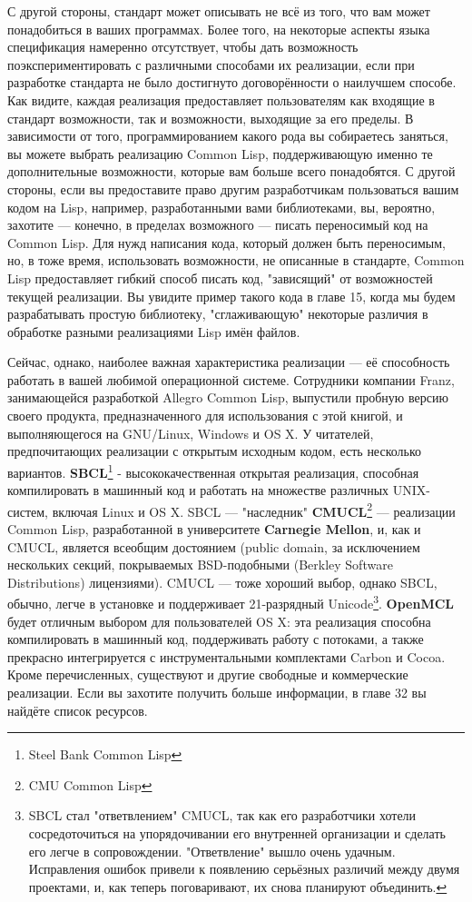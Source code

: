 С другой стороны, стандарт может описывать не всё из того, что вам может понадобиться в
ваших программах. Более того, на некоторые аспекты языка спецификация намеренно
отсутствует, чтобы дать возможность поэкспериментировать с различными способами их
реализации, если при разработке стандарта не было достигнуто договорённости о наилучшем
способе. Как видите, каждая реализация предоставляет пользователям как входящие в стандарт
возможности, так и возможности, выходящие за его пределы. В зависимости от того,
программированием какого рода вы собираетесь заняться, вы можете выбрать реализацию Common
Lisp, поддерживающую именно те дополнительные возможности, которые вам больше всего
понадобятся. С другой стороны, если вы предоставите право другим разработчикам
пользоваться вашим кодом на Lisp, например, разработанными вами библиотеками, вы,
вероятно, захотите --- конечно, в пределах возможного --- писать переносимый код на Common
Lisp. Для нужд написания кода, который должен быть переносимым, но, в тоже время,
использовать возможности, не описанные в стандарте, Common Lisp предоставляет гибкий
способ писать код, "зависящий" от возможностей текущей реализации. Вы увидите пример
такого кода в главе 15, когда мы будем разрабатывать простую библиотеку, "сглаживающую"
некоторые различия в обработке разными реализациями Lisp имён файлов.

Сейчас, однако, наиболее важная характеристика реализации --- её способность работать в
вашей любимой операционной системе. Сотрудники компании Franz, занимающейся разработкой
Allegro Common Lisp, выпустили пробную версию своего продукта, предназначенного для
использования с этой книгой, и выполняющегося на GNU/Linux, Windows и OS X. У читателей,
предпочитающих реализации с открытым исходным кодом, есть несколько
вариантов. \textbf{SBCL}\footnote{Steel Bank Common Lisp} - высококачественная открытая
реализация, способная компилировать в машинный код и работать на множестве различных
UNIX-систем, включая Linux и OS X. SBCL --- "наследник" \textbf{CMUCL}\footnote{CMU Common
  Lisp} --- реализации Common Lisp, разработанной в университете \textbf{Carnegie Mellon},
и, как и CMUCL, является всеобщим достоянием (public domain, за исключением нескольких
секций, покрываемых BSD-подобными (Berkley Software Distributions) лицензиями). CMUCL ---
тоже хороший выбор, однако SBCL, обычно, легче в установке и поддерживает 21-разрядный
Unicode\footnote{SBCL стал "ответвлением" CMUCL, так как его разработчики хотели
  сосредоточиться на упорядочивании его внутренней организации и сделать его легче в
  сопровождении. "Ответвление" вышло очень удачным. Исправления ошибок привели к появлению
  серьёзных различий между двумя проектами, и, как теперь поговаривают, их снова планируют
  объединить.}. \textbf{OpenMCL} будет отличным выбором для пользователей OS X: эта
реализация способна компилировать в машинный код, поддерживать работу с потоками, а также
прекрасно интегрируется с инструментальными комплектами Carbon и Cocoa. Кроме
перечисленных, существуют и другие свободные и коммерческие реализации. Если вы захотите
получить больше информации, в главе 32 вы найдёте список ресурсов.

